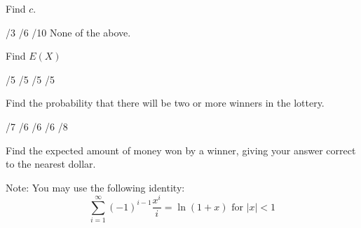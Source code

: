 \documentclass[letterpaper,10pt,addpoints]{exam}
\begin{document}
\begin{questions}

\question Find $c$.
\begin{choices}
  /3
  /6
  /10
  \choice None of the above.
\end{choices}
\question Find $E(X)$
\begin{choices}
  /5
  /5
  /5
  /5
\end{choices}
\question Find the probability that there will be two or more winners in the lottery.
\begin{choices}
  /7
  /6
  /6
  /6
  /8
\end{choices}

\question Find the expected amount of money won by a winner, giving your answer correct to the nearest dollar.

Note: You may use the following identity:
$$
\sum_{i=1}^{\infty}(-1)^{i-1} \frac{x^i}{i}=\ln (1+x) \text { for }|x|<1
$$
\begin{choices}
\end{choices}






\end{questions}
\end{document}
